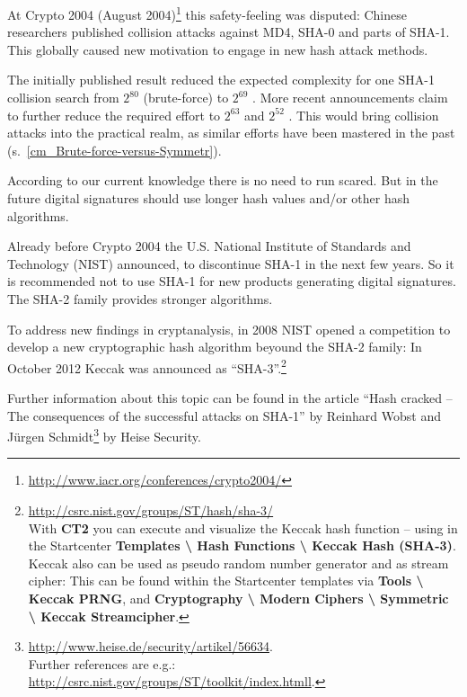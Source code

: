\begin{bibunit}[babalpha]
At Crypto 2004 (August 2004)\footnote{%
    \url{http://www.iacr.org/conferences/crypto2004/} }
this safety-feeling was disputed: 
Chinese researchers published collision attacks against MD4, SHA-0 and
parts of SHA-1. This globally caused new motivation to engage in
new hash attack methods.

The initially published result reduced the expected complexity for one SHA-1
collision search from $2^{80}$ (brute-force) to $2^{69}$
\cite{Wang2005}. More recent announcements claim to further reduce the required
effort to $2^{63}$ \cite{Wang2005b} and $2^{52}$ \cite{McDonald2009}. This would
bring collision attacks into the practical realm, as similar efforts have been
mastered in the past (s.\ \ref{cm_Brute-force-versus-Symmetr}).


According to our current knowledge there is no need to run scared.
But in the future digital signatures should use longer hash values and/or
other hash algorithms.

Already before Crypto 2004 the U.S. National Institute of Standards and
Technology (NIST) announced, to discontinue SHA-1 in the next few
years. So it is recommended not to use SHA-1 for new products generating digital
signatures. The SHA-2 family \cite{FIPS180} provides stronger algorithms.

To address new findings in cryptanalysis, in 2008 NIST opened a competition to
develop a new cryptographic hash algorithm beyound the SHA-2 family: In October
2012 Keccak was announced as ``SHA-3''.\footnote{%
\url{http://csrc.nist.gov/groups/ST/hash/sha-3/}\\
    With {\bf CT2} you can execute and visualize
    the Keccak hash function -- using in the Startcenter
    {\bf Templates \textbackslash{} Hash Functions \textbackslash{}
    Keccak Hash (SHA-3)}.\\
    Keccak also can be used as pseudo random number generator and as stream
    cipher: This can be found within the Startcenter templates via
    {\bf Tools \textbackslash{} Keccak PRNG}, and 
    {\bf Cryptography \textbackslash{} Modern Ciphers \textbackslash{}
         Symmetric \textbackslash{} Keccak Streamcipher}.
}

Further information about this topic can be found in the article
``Hash cracked -- The consequences of the successful attacks on SHA-1''
by Reinhard Wobst and J\"urgen Schmidt\footnote{%
      \url{http://www.heise.de/security/artikel/56634}.\\
  Further references are e.g.:\\
      \url{http://csrc.nist.gov/groups/ST/toolkit/index.htmll}.
} 
  by Heise Security.





\end{bibunit}
